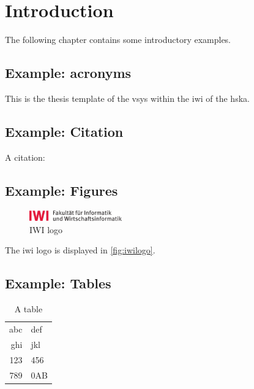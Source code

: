
\chapter{Introduction}
\label{ch:Introduction}


The following chapter contains some introductory examples.

\section{Example: acronyms}

This is the thesis template of the \gls{vsys} within the \Gls{iwi} of the \gls{hska}.

\section{Example: Citation}
\label{sec:Introduction:Citation}
A citation: \cite{becker2008a}

\section{Example: Figures}
\label{sec:Introduction:Figures}
\begin{figure}[h]
\centering
\includegraphics[width=4cm]{logos/IWI-HsKA_CMYK_V01}
\caption{IWI logo}
\label{fig:iwilogo}
\end{figure}

The \gls{iwi} logo is displayed in \autoref{fig:iwilogo}.

\section{Example: Tables}
\label{sec:Introduction:Tables}
\begin{table}[h]
\centering
\begin{tabular}{r l}
\toprule
abc & def\\
ghi & jkl\\
\midrule
123 & 456\\
789 & 0AB\\
\bottomrule
\end{tabular}
\caption{A table}
\label{tab:atable}
\end{table}

